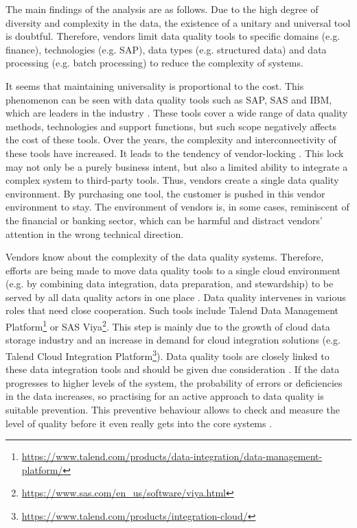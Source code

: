       		The main findings of the analysis are as follows. Due to the high degree of diversity and complexity in the data, the existence of a unitary and universal tool is doubtful. Therefore, vendors limit data quality tools to specific domains (e.g. finance), technologies (e.g. SAP), data types (e.g. structured data) and data processing (e.g. batch processing) to reduce the complexity of systems.
      		
      		It seems that maintaining universality is proportional to the cost. This phenomenon can be seen with data quality tools such as SAP, SAS and IBM, which are leaders in the industry \cite{Chien2019}. These tools cover a wide range of data quality methods, technologies and support functions, but such scope negatively affects the cost of these tools. Over the years, the complexity and interconnectivity of these tools have increased. It leads to the tendency of vendor-locking \cite{Chien2019}. This lock may not only be a purely business intent, but also a limited ability to integrate a complex system to third-party tools. Thus, vendors create a single data quality environment. By purchasing one tool, the customer is pushed in this vendor environment to stay. The environment of vendors is, in some cases, reminiscent of the financial or banking sector, which can be harmful and distract vendors' attention in the wrong technical direction.
      		
      		Vendors know about the complexity of the data quality systems. Therefore, efforts are being made to move data quality tools to a single cloud environment (e.g. by combining data integration, data preparation, and stewardship) to be served by all data quality actors in one place \cite{McDaniel2019}. Data quality intervenes in various roles that need close cooperation. Such tools include Talend Data Management Platform\footnote{\url{https://www.talend.com/products/data-integration/data-management-platform/}} or SAS Viya\footnote{\url{https://www.sas.com/en_us/software/viya.html}}. This step is mainly due to the growth of cloud data storage industry and an increase in demand for cloud integration solutions (e.g. Talend Cloud Integration Platform\footnote{\url{https://www.talend.com/products/integration-cloud/}}). Data quality tools are closely linked to these data integration tools and should be given due consideration \cite{McDaniel2019}. If the data progresses to higher levels of the system, the probability of errors or deficiencies in the data increases, so practising for an active approach to data quality is suitable prevention. This preventive behaviour allows to check and measure the level of quality before it even really gets into the core systems \cite{McDaniel2019}.
      		
